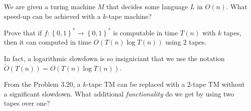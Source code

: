 \documentclass[usletter]{article}
\begin{document}
\begin{problem}
    We are given a turing machine \(M\) that decides some language \(L\) in \(O(n)\). What speed-up can be achieved with a \(k\)-tape machine?
\end{problem}

\begin{problem}
    Prove that if \(f: \left\{ 0,1 \right\}^* \to \left\{ 0,1 \right\}^*\) is computable in time \(T(n)\) with \(k\) tapes, then it can computed in time \(O(T(n)\log T(n))\) using \(2\) tapes. 
\end{problem}

\begin{remark}
    In fact, a logarithmic slowdown is so insigniciant that we use the notation \(\tilde{O}(T(n)) = O(T(n)\log T(n))\).
\end{remark}

\begin{problem}
    From the Problem 3.20, a \(k\)-tape TM can be replaced with a \(2\)-tape TM without a significant slowdown. What additional \textit{functionality} do we get by using two tapes over one?
\end{problem}







\end{document}
